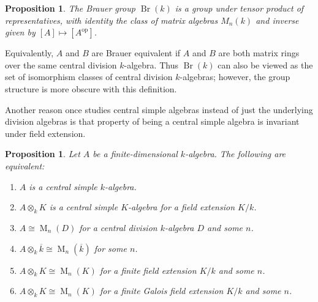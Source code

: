 \documentclass[12pt]{article}
\theoremstyle{plain}
\newtheorem{proposition}[theorem]{Proposition}
\theoremstyle{definition}
\theoremstyle{remark}
\numberwithin{equation}{section}
\begin{document}
\begin{proposition}
The Brauer group $\operatorname{Br}(k)$ is a group under
tensor product of representatives,
with identity the class of matrix algebras $M_n(k)$
and inverse given by $[A] \mapsto [A^{\mathrm{op}}]$.
\end{proposition}

Equivalently, $A$ and $B$ are Brauer equivalent if $A$ and $B$ are both
matrix rings over the same central division $k$-algebra.
Thus $\operatorname{Br}(k)$ can also be viewed as the set of isomorphism
classes of central division $k$-algebras; however, the group structure
is more obscure with this definition.

Another reason once studies central simple algebras instead of just the
underlying division algebras is that property of being a central simple
algebra is invariant under field extension.

\begin{proposition}
Let $A$ be a finite-dimensional $k$-algebra.
The following are equivalent:
\begin{enumerate}
\item[(a)] $A$ is a central simple $k$-algebra.
\item[(b)] $A \otimes_k K$ is a central simple $K$-algebra for a field
extension $K/k$.
\item[(c)] $A \cong \operatorname{M}_n(D)$ for a central division $k$-algebra
$D$ and some $n$.
\item[(d)] $A \otimes_k \overline{k} \cong \operatorname{M}_n(\overline{k})$
for some $n$.
\item[(e)] $A \otimes_k K \cong \operatorname{M}_n(K)$
for a finite field extension $K/k$ and some $n$.
\item[(f)] $A \otimes_k K \cong \operatorname{M}_n(K)$
for a finite Galois field extension $K/k$ and some $n$.
\end{enumerate}
\end{proposition}
\end{document}
